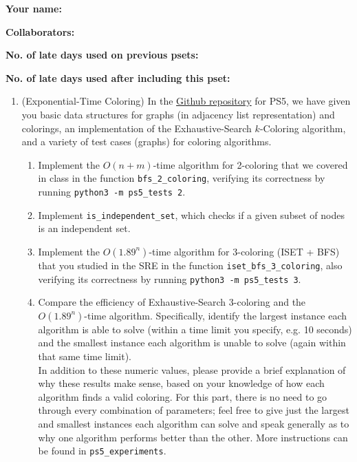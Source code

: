 \documentclass[11pt]{article}
\begin{document}

\textbf{Your name: }

\textbf{Collaborators: }

\textbf{No. of late days used on previous psets: }

\textbf{No. of late days used after including this pset: }

\begin{enumerate}
 
 \item (Exponential-Time Coloring) 
  In the \href{https://github.com/Harvard-CS-120/cs120/tree/main/fall2022/psets}{Github repository} for PS5, we have given you basic data structures for graphs (in adjacency list representation) and colorings, an implementation of the Exhaustive-Search $k$-Coloring algorithm, and a variety of test cases (graphs) for coloring algorithms.

  \begin{enumerate}
      \item Implement the $O(n+m)$-time algorithm for 2-coloring that we covered in class in the function \texttt{bfs\_2\_coloring}, verifying its correctness by running \texttt{python3 -m ps5\_tests 2}.
      
      \item Implement \texttt{is\_independent\_set}, which checks if a given subset of nodes is an independent set.
      
      \item Implement the $O(1.89^n)$-time algorithm for 3-coloring (ISET + BFS) that you studied in the SRE in the function \texttt{iset\_bfs\_3\_coloring}, also verifying its correctness by running \texttt{python3 -m ps5\_tests 3}. \label{part:TbT}
      
      \item Compare the efficiency of Exhaustive-Search 3-coloring and the $O(1.89^n)$-time algorithm. Specifically, identify the largest instance each algorithm is able to solve (within a time limit you specify, e.g. 10 seconds) and the smallest instance each algorithm is unable to solve (again within that same time limit). \\
    
    In addition to these numeric values, please provide a brief explanation of why these results make sense, based on your knowledge of how each algorithm finds a valid coloring. For this part, there is no need to go through every combination of parameters; feel free to give just the largest and smallest instances each algorithm can solve and speak generally as to why one algorithm performs better than the other. More instructions can be found in \texttt{ps5\_experiments}.
    

\end{enumerate}
\end{enumerate}
\end{document}
